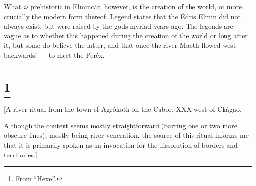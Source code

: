 \documentclass{article}
\let\oldthefootnote\thefootnote
\newcommand\oocfootnote[2][DarkGreen]{\renewcommand\thefootnote{\color{#1}\oldthefootnote}%
  \footnote{\color{#1}#2}%
  \renewcommand{\thefootnote}{\oldthefootnote}}
\begin{document}
What \emph{is} prehistoric in Elmincár, however, is the creation of the world, or more crucially the modern form thereof. Legend states that the Édris Elmin did not always exist, but were raised by the gods myriad years ago. The legends are vague as to whether this happened during the creation of the world or long after it, but some do believe the latter, and that once the river Maoth flowed west — backwards! — to meet the Peréx.

\color{black}

\section{\oocfootnote{From ``Hexe''.}}

[A river ritual from the town of Agrókoth on the Cabor, XXX west of Chágao.

Although the content seems mostly straightforward (barring one or two more obscure lines), mostly being river veneration, the source of this ritual informs me that it is primarily spoken as an invocation for the dissolution of borders and territories.]
\end{document}
